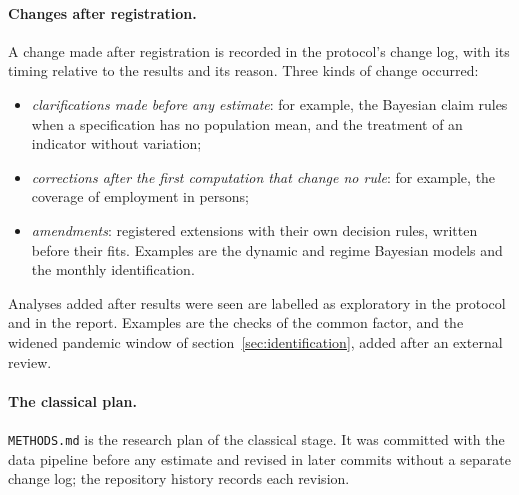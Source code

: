 \paragraph{Changes after registration.} A change made after registration is recorded in
the protocol's change log, with its timing relative to the results and its reason. Three
kinds of change occurred:
\begin{itemize}
  \item \emph{clarifications made before any estimate}: for example, the Bayesian claim
    rules when a specification has no population mean, and the treatment of an indicator
    without variation;
  \item \emph{corrections after the first computation that change no rule}: for example,
    the coverage of employment in persons;
  \item \emph{amendments}: registered extensions with their own decision rules, written
    before their fits. Examples are the dynamic and regime Bayesian models and the monthly
    identification.
\end{itemize}
Analyses added after results were seen are labelled as exploratory in the protocol and in
the report. Examples are the checks of the common factor, and the widened pandemic window
of section~\ref{sec:identification}, added after an external review.

\paragraph{The classical plan.} \texttt{METHODS.md} is the research plan of the classical
stage. It was committed with the data pipeline before any estimate and revised in later
commits without a separate change log; the repository history records each revision.



